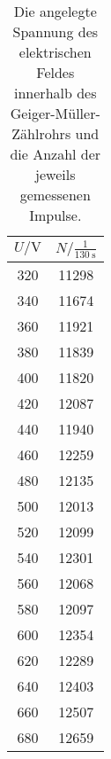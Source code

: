 \begin{table}\caption{Die angelegte Spannung des elektrischen Feldes innerhalb des Geiger-Müller-Zählrohrs und die Anzahl der jeweils gemessenen Impulse.}
\label{taba}
\centering
{}
\begin{tabular}{c c} 
\toprule
{$U / \si{\volt}$} & {$N / \frac{1}{\SI{130}{\second}}$}\\
\midrule
320 & 11298\\
340 & 11674\\
360 & 11921\\
380 & 11839\\
400 & 11820\\
420 & 12087\\
440 & 11940\\
460 & 12259\\
480 & 12135\\
500 & 12013\\
520 & 12099\\
540 & 12301\\
560 & 12068\\
580 & 12097\\
600 & 12354\\
620 & 12289\\
640 & 12403\\
660 & 12507\\
680 & 12659\\
\bottomrule
\end{tabular}\end{table}